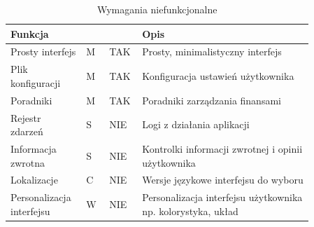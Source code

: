 \documentclass[a4paper,10pt, twoside]{report}
\newcommand{\customstyletable}[1]{\footnotesize{\textbf{#1}}}
\newcommand{\customstyletablecentered}[1]{\footnotesize\centering{\textbf{#1}}}
\begin{document}
\begin{large}
\begin{table}[H] %
    \caption{Wymagania niefunkcjonalne}
    \label{Wymagania niefunkcjonalne}
    \footnotesize
    \begin{tabular}{|p{0.2\linewidth}|p{0.07\linewidth}|p{0.07\linewidth}|p{0.52\linewidth}|}  %
    \hline                  %
    \customstyletable{Funkcja} & \customstyletablecentered{PRIO} & \customstyletablecentered{IMPL}& \customstyletable{Opis} \\
    \hline
    {Prosty interfejs} & {M} & {TAK} & {Prosty, minimalistyczny interfejs}\\
    \hline
    {Plik konfiguracji} & {M} & {TAK} & {Konfiguracja ustawień użytkownika}\\
    \hline
    {Poradniki} & {M} & {TAK} & {Poradniki zarządzania finansami}\\
    \hline
    {Rejestr zdarzeń} & {S} & {NIE} & {Logi z działania aplikacji}\\
    \hline
    {Informacja zwrotna} & {S} & {NIE} & {Kontrolki informacji zwrotnej i opinii użytkownika}\\
    \hline
    {Lokalizacje} & {C} & {NIE} & {Wersje językowe interfejsu do wyboru}\\
    \hline
    {Personalizacja interfejsu} & {W} & {NIE} & {Personalizacja interfejsu użytkownika np. kolorystyka, układ}\\
    \hline
    \end{tabular}
\end{table}


\end{large}
\end{document}
